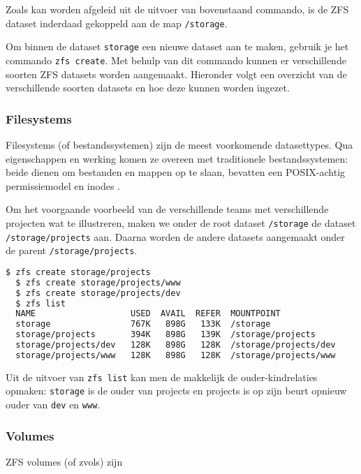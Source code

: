 Zoals kan worden afgeleid uit de uitvoer van bovenstaand commando, is de ZFS dataset inderdaad gekoppeld aan de map \texttt{/storage}.

Om binnen de dataset \texttt{storage} een nieuwe dataset aan te maken, gebruik je het commando \texttt{zfs create}. Met behulp van dit commando kunnen er verschillende soorten ZFS datasets worden aangemaakt. Hieronder volgt een overzicht van de verschillende soorten datasets en hoe deze kunnen worden ingezet.

\subsubsection{Filesystems}

Filesystems (of bestandssystemen) zijn de meest voorkomende datasettypes. Qua eigenschappen en werking komen ze overeen met traditionele bestandssystemen: beide dienen om bestanden en mappen op te slaan, bevatten een POSIX-achtig permissiemodel en inodes \autocite{Lucas2015}. 

Om het voorgaande voorbeeld van de verschillende teams met verschillende projecten wat te illustreren, maken we onder de root dataset \texttt{/storage} de dataset \texttt{/storage/projects} aan. Daarna worden de andere datasets aangemaakt onder de parent \texttt{/storage/projects}.

\begin{lstlisting}[language=bash,style=command_style] 
  $ zfs create storage/projects
  $ zfs create storage/projects/www
  $ zfs create storage/projects/dev
  $ zfs list
  NAME                   USED  AVAIL  REFER  MOUNTPOINT
  storage                767K   898G   133K  /storage
  storage/projects       394K   898G   139K  /storage/projects
  storage/projects/dev   128K   898G   128K  /storage/projects/dev
  storage/projects/www   128K   898G   128K  /storage/projects/www
\end{lstlisting}

Uit de uitvoer van \texttt{zfs list} kan men de makkelijk de ouder-kindrelaties opmaken: \texttt{storage} is de ouder van projects en projects is op zijn beurt opnieuw ouder van \texttt{dev} en \texttt{www}.

\subsubsection{Volumes}

ZFS volumes (of zvols) zijn 
